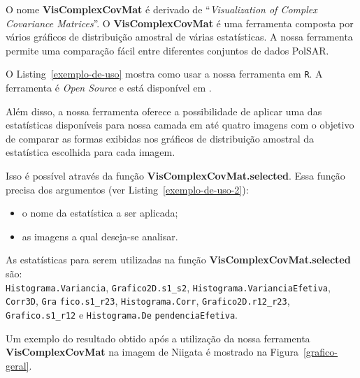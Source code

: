 \documentclass[journal]{IEEEtran}
\begin{document}
O nome \textbf{VisComplexCovMat} é derivado de ``\textit{Visualization of Complex Covariance Matrices}''. O \textbf{VisComplexCovMat} é uma ferramenta composta por vários gráficos de distribuição amostral de várias estatísticas. A nossa ferramenta permite uma comparação fácil entre diferentes conjuntos de dados PolSAR.     

O Listing~\ref{exemplo-de-uso} mostra como usar a nossa ferramenta em \texttt{R}. A ferramenta é \textit{Open Source} e está disponível em . 
\begin{figure}[!t]

\vspace*{4pt}
\end{figure}
Além disso, a nossa ferramenta oferece a possibilidade de aplicar uma das estatísticas disponíveis para nossa camada em até quatro imagens com o objetivo de comparar as formas exibidas nos gráficos de distribuição amostral da estatística escolhida para cada imagem.

Isso é possível através da função \textbf{VisComplexCovMat.selected}. Essa função precisa dos argumentos (ver Listing~\ref{exemplo-de-uso-2}):

\begin{itemize}
\item o nome da estatística a ser aplicada;
\item as imagens a qual deseja-se analisar. 
\end{itemize}

As estatísticas para serem utilizadas na função \textbf{VisComplexCovMat.selected} são:\\
\texttt{Histograma.Variancia}, \texttt{Grafico2D.s1\_s2}, \texttt{Histograma.VarianciaEfetiva}, \texttt{Corr3D}, \texttt{Gra} \texttt{fico.s1\_r23}, \texttt{Histograma.Corr}, \texttt{Grafico2D.r12\_r23}, \texttt{Grafico.s1\_r12} e \texttt{Histograma.De} \texttt{pendenciaEfetiva}.
\begin{figure}[!t]
   
\vspace*{4pt}
\end{figure}
Um exemplo do resultado obtido após a utilização da nossa ferramenta \textbf{VisComplexCovMat}  na imagem de Niigata é mostrado na Figura~\ref{grafico-geral}.
\end{document}

